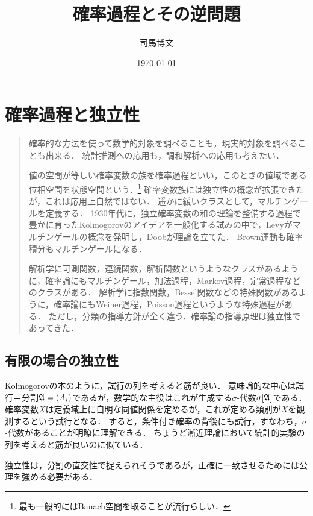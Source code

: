 \documentclass[uplatex,dvipdfmx]{jsreport}
\title{確率過程とその逆問題}
\author{司馬博文}
\date{\today}
\begin{document}
\tableofcontents

\chapter{確率過程と独立性}

\begin{quotation}
    確率的な方法を使って数学的対象を調べることも，現実的対象を調べることも出来る．
    統計推測への応用も，調和解析への応用も考えたい．

    値の空間が等しい確率変数の族を確率過程といい，このときの値域である位相空間を状態空間という．\footnote{最も一般的にはBanach空間を取ることが流行らしい．}
    確率変数族には独立性の概念が拡張できたが，これは応用上自然ではない．
    遥かに緩いクラスとして，マルチンゲールを定義する．
    1930年代に，独立確率変数の和の理論を整備する過程で豊かに育ったKolmogorovのアイデアを一般化する試みの中で，Levyがマルチンゲールの概念を発明し，Doobが理論を立てた．
    Brown運動も確率積分もマルチンゲールになる．

    解析学に可測関数，連続関数，解析関数というようなクラスがあるように，確率論にもマルチンゲール，加法過程，Markov過程，定常過程などのクラスがある．
    解析学に指数関数，Bessel関数などの特殊関数があるように，確率論にもWeiner過程，Poisson過程というような特殊過程がある．
    ただし，分類の指導方針が全く違う．確率論の指導原理は独立性であってきた．
\end{quotation}

\section{有限の場合の独立性}

\begin{tcolorbox}[colframe=ForestGreen, colback=ForestGreen!10!white,breakable,colbacktitle=ForestGreen!40!white,coltitle=black,fonttitle=\bfseries\sffamily,
title=]
    Kolmogorovの本のように，試行の列を考えると筋が良い．
    意味論的な中心は試行＝分割$\mathfrak{A}=(A_i)$であるが，数学的な主役はこれが生成する$\sigma$-代数$\sigma[\mathfrak{A}]$である．
    確率変数$X$は定義域上に自明な同値関係を定めるが，これが定める類別が$X$を観測するという試行となる．
    すると，条件付き確率の背後にも試行，すなわち，$\sigma$-代数があることが明瞭に理解できる．
    ちょうど漸近理論において統計的実験の列を考えると筋が良いのに似ている．

    独立性は，分割の直交性で捉えられそうであるが，正確に一致させるためには公理を強める必要がある．
\end{tcolorbox}
\end{document}
